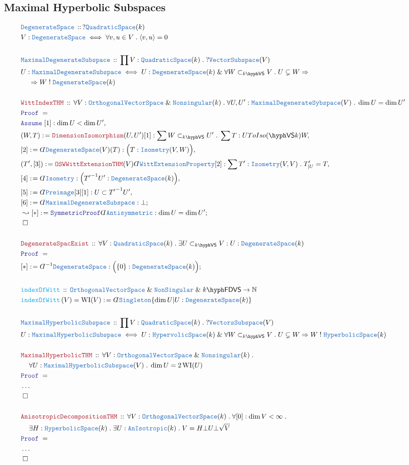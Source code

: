 \documentclass[12pt]{scrartcl}%
\newcommand{\TYPE}[1]{\textcolor{NavyBlue}{\mathtt{#1}}}%
\newcommand{\FUNC}[1]{\textcolor{Cerulean}{\mathtt{#1}}}%
\newcommand{\LOGIC}[1]{\textcolor{Blue}{\mathtt{#1}}}%
\newcommand{\THM}[1]{\textcolor{Maroon}{\mathtt{#1}}}%
\renewcommand{\.}{\; . \;} %
\newcommand{\de}{: \kern 0.1pc =} %
\newcommand{\IsNot}{\; ! \;} %
\newcommand{\Act}[1]{\left( #1 \right)} %
\newcommand{\Theorem}[2]{& \THM{#1} \, :: \, #2 \\ & \Proof = \\ } %
\newcommand{\DeclareType}[2]{& \TYPE{#1} \, :: \, #2 \\}%
\newcommand{\DefineType}[3]{& #1 : \TYPE{#2} \iff #3 \\}%
\newcommand{\DeclareFunc}[2]{& \FUNC{#1} \, :: \, #2 \\}%
\newcommand{\DefineNamedFunc}[4]{&  \FUNC{#1}\Act{#2} = #3 \de #4 \\}%
\newcommand{\NewLine}{\\ & \kern 1pc}%
\newcommand{\Page}[1]{ \begin{align*} #1 \end{align*}  }%
\newcommand{ \bd }{ \ByDef }%
\newcommand{\NoProof}{ & \ldots \\ \EndProof}%
\renewcommand{\And}{\; \& \;}%
\newcommand{\Imply}{\Rightarrow}
\newcommand{\Nat}{\mathbb{N}}%
\newcommand{\Say}[3]{& #1 \de #2 : #3, \\} %
\newcommand{\Conclude}[3]{& #1 \de #2 : #3; \\}%
\newcommand{\DeriveConclude}[3]{& \leadsto #1 \de #2 : #3 ; \\} %
\newcommand{\Assume}[2]{& \LOGIC{Assume} \; #1 : #2, \\} %
\newcommand{\QED}{\; \square} %
\newcommand{\EndProof}{& \QED \\} %
\newcommand{\ByDef}{\rotatebox[origin=c]{-180}{$D$}}%
\newcommand{\Proof}{\LOGIC{Proof} \; } %
\newcommand{\subvec}[1]{\subset_{\VS{#1}}}%
\newcommand{\OVS}{\TYPE{OrthogonalVectorSpace}}
\DeclareMathOperator{\WI}{\mathrm{WI}} %
\newcommand{\VS}[1]{#1\hyph\mathsf{VS}} %
\newcommand{\FDVS}[1]{#1\hyph\mathsf{FDVS}} %
\begin{document}
\subsection{Maximal Hyperbolic Subspaces}
\Page{
	\DeclareType{DegenerateSpace}{ ? \TYPE{QuadraticSpace}(k) }
	\DefineType{V}{DegenerateSpace}{\forall v,u \in V \. \langle v, u \rangle = 0}
	\\
	\DeclareType{MaximalDegenerateSubspace}{ \prod V :  \TYPE{QuadraticSpace}(k) \. ? \TYPE{VectorSubspace}(V) }
	\DefineType{U}{MaximalDegenerateSubspace}{U : \TYPE{DegenerateSpace}(k) \And \forall W \subvec{k} V \. U \subsetneq W \Imply \NewLine \Imply W \IsNot \TYPE{DegenerateSpace}(k)}
	\\
	\Theorem{WittIndexTHM}{\forall V : \OVS \And \TYPE{Nonsingular}(k) \. \forall U,U' : \TYPE{MaximalDegenerateSybspace}(V) \. \dim U = \dim U'}
	\Assume{[1]}{\dim U < \dim U'}
	\Say{(W,T)}{\THM{DimensionIsomorphism}(U,U')[1]}{\sum W \subvec{k} U' \. \sum T : U ToIso{\VS(k)} W}
	\Say{[2]}{\bd \TYPE{DegenerateSpace}(V)(T)}{\Big(T : \TYPE{Isometry}(V,W)\Big)}
	\Say{(T',[3])}{\THM{OSWWittExtensionTHM}(V)\bd \TYPE{WittExtensionProperty}[2]}{ \sum T' : \TYPE{Isometry}(V,V) \. T_{|U}' = T  }
	\Say{[4]}{\bd \TYPE{Isometry}}{\Big( {T'}^{-1}U' : \TYPE{DegenerateSpace}(k) \Big)}
	\Say{[5]}{\bd \TYPE{Preimage}[3][1]}{ U \subset {T'}^{-1}U'}
	\Conclude{[6]}{\bd \TYPE{MaximalDegenerateSubspace}}{\bot}
	\DeriveConclude{[*]}{\LOGIC{SymmetricProof}\bd \TYPE{Antisymmetric}}{\dim U = \dim U'}
	\EndProof
	\\
	\Theorem{DegenerateSpacExist}{\forall V : \TYPE{QuadraticSpace}(k) \. \exists U \subvec{k} V : U : \TYPE{DegenerateSpace}(k)}
	\Conclude{[*]}{\bd^{-1}\TYPE{DegenerateSpace}}{\Big(\{0\} : \TYPE{DegenerateSpace}(k) \Big) }
	\\
	\DeclareFunc{indexOfWitt}{ \OVS \And \TYPE{NonSingular} \And \FDVS{k} \to \Nat}
	\DefineNamedFunc{indexOfWitt}{V}{\WI(V)}{\bd \TYPE{Singleton}\{ \dim U | U : \TYPE{DegenerateSpace}(k)\}}
	\\
	\DeclareType{MaximalHyperbolicSubspace}{\prod V : \TYPE{QuadraticSpace}(k) \.  ?\TYPE{VectorsSubspace}(V) }
	\DefineType{U}{MaximalHyperbolicSubspace}{ U : \TYPE{HypervolicSpace}(k) \And \forall W \subvec{k} V \. U \subsetneq W \Imply W \IsNot \TYPE{HyperbolicSpace}(k) }
	\\
	\Theorem{MaximalHyperbolicTHM}{\forall V : \OVS \And \TYPE{Nonsingular}(k) \. \NewLine \forall U : \TYPE{MaximalHyperbolicSubspace}(V) \. \dim U = 2\WI(U)}
	\NoProof
	\\
	\Theorem{AnisotropicDecompositionTHM}{\forall V : \OVS(k) \. \forall [0] : \dim V < \infty \. \NewLine 
		\exists H : \TYPE{HyperbolicSpace}(k) \.  \exists U : \TYPE{AnIsotropic}(k) \. V = H \bot U \bot \sqrt{V}} 
	\NoProof
}
\end{document}
